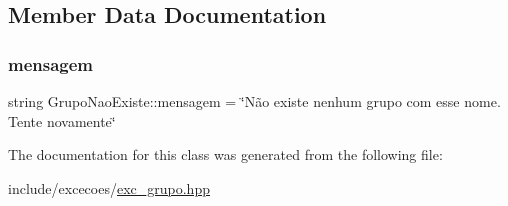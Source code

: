 \subsection{Member Data Documentation}
\mbox{\label{classGrupoNaoExiste_ae3a886240476581b33f88327c3282525}} 
\subsubsection{\texorpdfstring{mensagem}{mensagem}}
{\footnotesize\ttfamily string Grupo\+Nao\+Existe\+::mensagem = \char`\"{}Não existe nenhum grupo com esse nome. Tente novamente\char`\"{}\hspace{0.3cm}{\ttfamily [private]}}



The documentation for this class was generated from the following file\+:\begin{DoxyCompactItemize}
\item 
include/excecoes/\hyperlink{exc__grupo_8hpp}{exc\+\_\+grupo.\+hpp}\end{DoxyCompactItemize}

